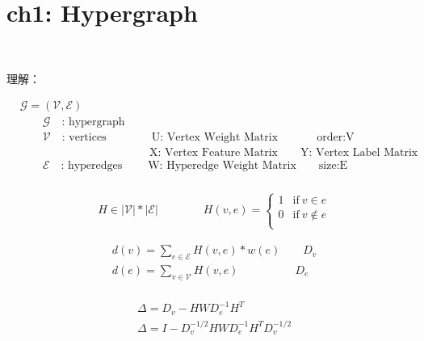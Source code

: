 \documentclass{article}
\begin{document}
\section*{ch1: Hypergraph}


~ \\[3pt]
\begin{CJK}{UTF8}{gbsn}
    理解： \\[3pt]
\end{CJK}


%
\begin{align*}
    & \mathcal{G} = ( \mathcal{V} , \mathcal{E} )  \\[3pt]
        & \qquad \mathcal{G} \quad \text{: hypergraph}  \\[3pt]
        & \qquad \mathcal{V} \quad \text{: vertices} 
          \qquad \qquad \text{U: Vertex Weight Matrix} 
          \qquad \quad \ \ \text{order:V}  \\[3pt]
        & \qquad \qquad \qquad \qquad \qquad \quad \ \ \text{X: Vertex Feature Matrix} 
          \qquad \text{Y: Vertex Label Matrix}  \\[3pt]
        & \qquad \mathcal{E} \quad \text{: hyperedges} 
          \qquad \; \text{W: Hyperedge Weight Matrix} 
          \qquad \text{size:E}  \\[3pt]
\end{align*}

%
\begin{align*}
    & H \in { |\mathcal{V}| * |\mathcal{E}| } \qquad \qquad 
    H(v, e) = \left\{ 
        \begin{array}{cc}
            1       & \text{if} \ v \in e    \\[3pt]
            0       & \text{if} \ v \notin e \\[3pt]
        \end{array} \right. 
\end{align*}

%
\begin{align*}
    & d(v) = \sum_{e \in \mathcal{E}} H(v, e)*w(e) \qquad D_{v} \\[3pt]
    & d(e) = \sum_{v \in \mathcal{V}} H(v, e)      \qquad \qquad \quad D_{e} \\[3pt]
\end{align*}

%
\begin{align*}
    & \Delta = D_{v} - H W D_{e}^{-1} H^{T} \\[3pt]
    & \Delta = I - D_{v}^{-1/2} H W D_{e}^{-1} H^{T} D_{v}^{-1/2} \\[3pt]
\end{align*}
\end{document}
